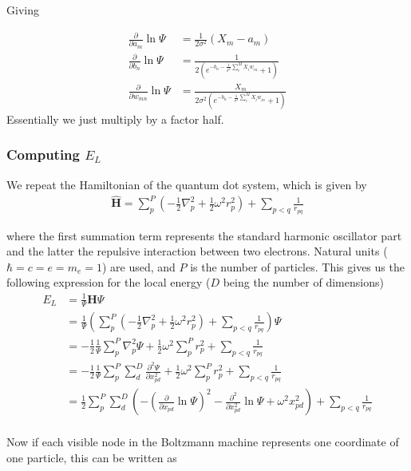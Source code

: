 \documentclass[twoside,english]{uiofysmaster}
\begin{document}
Giving

\begin{align}
	\frac{\partial }{\partial a_m} \ln\Psi
	&= 	\frac{1}{2\sigma^2} (X_m - a_m) \\
	\frac{\partial }{\partial b_n} \ln\Psi
	&=
	\frac{1}{2(e^{-b_n-\frac{1}{\sigma^2}\sum_i^M X_i w_{in}} + 1)} \\
	\frac{\partial }{\partial w_{mn}} \ln\Psi
	&= \frac{X_m}{2\sigma^2(e^{-b_n-\frac{1}{\sigma^2}\sum_i^M X_i w_{in}} + 1)}
\end{align}
Essentially we just multiply by a factor half.

\subsubsection{Computing $E_L$}
We repeat the Hamiltonian of the quantum dot system, which is given by
\begin{align}
	\hat{\mathbf{H}} = \sum_p^P (-\frac{1}{2}\nabla_p^2 + \frac{1}{2}\omega^2 r_p^2 ) + \sum_{p<q} \frac{1}{r_{pq}}
\end{align}

where the first summation term represents the standard harmonic oscillator part and the latter the repulsive interaction between two electrons. Natural units ($\hbar=c=e=m_e=1$) are used, and $P$ is the number of particles. This gives us the following expression for the local energy  ($D$ being the number of dimensions)
\begin{align}
	E_L &= \frac{1}{\Psi} \mathbf{H} \Psi \\
	&= \frac{1}{\Psi} (\sum_p^P (-\frac{1}{2}\nabla_p^2 + \frac{1}{2}\omega^2 r_p^2 ) + \sum_{p<q} \frac{1}{r_{pq}}) \Psi \\
	&= -\frac{1}{2}\frac{1}{\Psi} \sum_p^P \nabla_p^2 \Psi 
	+ \frac{1}{2}\omega^2 \sum_p^P  r_p^2  + \sum_{p<q} \frac{1}{r_{pq}} \\
	&= -\frac{1}{2}\frac{1}{\Psi} \sum_p^P \sum_d^D \frac{\partial^2 \Psi}{\partial x_{pd}^2} + \frac{1}{2}\omega^2 \sum_p^P  r_p^2  + \sum_{p<q} \frac{1}{r_{pq}} \\
	&= \frac{1}{2} \sum_p^P \sum_d^D (-(\frac{\partial}{\partial x_{pd}} \ln\Psi)^2 -\frac{\partial^2}{\partial x_{pd}^2} \ln\Psi + \omega^2 x_{pd}^2)  + \sum_{p<q} \frac{1}{r_{pq}} \\
\end{align}

Now if each visible node in the Boltzmann machine represents one coordinate of one particle, this can be written as
\end{document}
